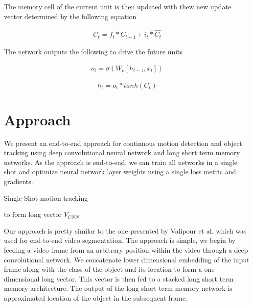 \documentclass[sigconf]{acmart}
\begin{document}
The memory cell of the current unit is then updated with thew new update vector determined by the following equation

\begin{align} \label{eqn18}
C_t = f_t * C_{t-1} + i_t * \hat{C_t}
\end{align}

The network outputs the following to drive the future units


\begin{align} \label{eqn19}
o_t = \sigma (W_o [h_{t-1},x_t])
\end{align}

\begin{align} \label{eqn20}
h_t = o_t * tanh(C_t)
\end{align}


\section{Approach} \label{approach}

We present an end-to-end approach for continuous motion detection and object tracking using deep convolutional neural network and long short term memory networks. As the approach is end-to-end, we can train all networks in a single shot and optimize neural network layer weights using a single loss metric and gradients. 

\begin{algorithm}

\caption{Single Shot motion tracking}\label{SSDLSTM}

\begin{algorithmic}[1] 
 to form long vector $V_{CNN}$
\EndProcedure
{}
\end{algorithmic}

\end{algorithm}

Our approach is pretty similar to the one presented by Valipour et al. \cite{ DBLP:journals/corr/ValipourSJR16} which was used for end-to-end video segmentation. The approach is simple, we begin by feeding a video frame from an arbitrary position within the video through a deep convolutional network.  We concatenate lower dimensional embedding of the input frame along with the class of the object and its location to form a one dimensional long vector. This vector is then fed to a stacked long short term memory architecture. The output of the long short term memory network is approximated location of the object in the subsequent frame. 
\end{document}
